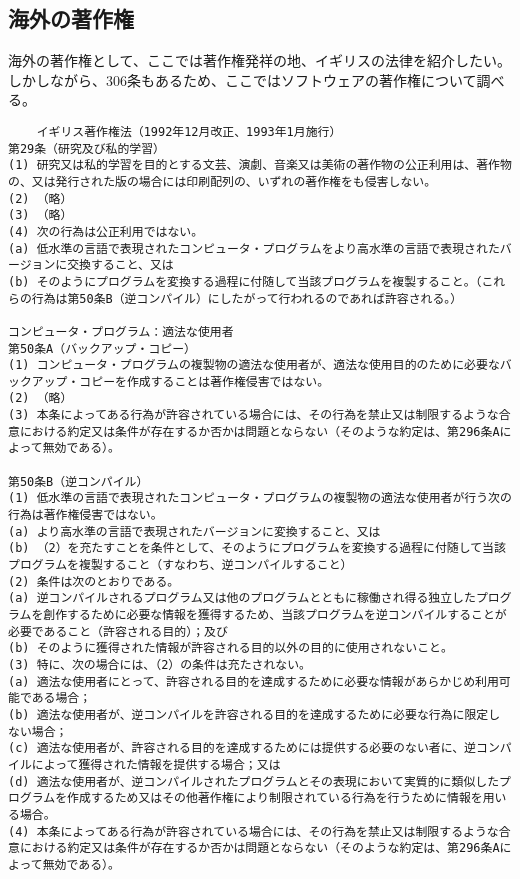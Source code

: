 \documentclass[a4j]{jsarticle}
\begin{document}
\subsection*{海外の著作権}
海外の著作権として、ここでは著作権発祥の地、イギリスの法律を紹介したい。しかしながら、306条もあるため、ここではソフトウェアの著作権について調べる。
\begin{verbatim}
    イギリス著作権法（1992年12月改正、1993年1月施行）
第29条（研究及び私的学習）
(1)	研究又は私的学習を目的とする文芸、演劇、音楽又は美術の著作物の公正利用は、著作物の、又は発行された版の場合には印刷配列の、いずれの著作権をも侵害しない。
(2)	（略）
(3)	（略）
(4)	次の行為は公正利用ではない。
(a)	低水準の言語で表現されたコンピュータ・プログラムをより高水準の言語で表現されたバージョンに交換すること、又は
(b)	そのようにプログラムを変換する過程に付随して当該プログラムを複製すること。（これらの行為は第50条B（逆コンパイル）にしたがって行われるのであれば許容される。）

コンピュータ・プログラム：適法な使用者
第50条A（バックアップ・コピー）
(1)	コンピュータ・プログラムの複製物の適法な使用者が、適法な使用目的のために必要なバックアップ・コピーを作成することは著作権侵害ではない。
(2)	（略）
(3)	本条によってある行為が許容されている場合には、その行為を禁止又は制限するような合意における約定又は条件が存在するか否かは問題とならない（そのような約定は、第296条Aによって無効である）。

第50条B（逆コンパイル）
(1)	低水準の言語で表現されたコンピュータ・プログラムの複製物の適法な使用者が行う次の行為は著作権侵害ではない。
(a)	より高水準の言語で表現されたバージョンに変換すること、又は
(b)	（2）を充たすことを条件として、そのようにプログラムを変換する過程に付随して当該プログラムを複製すること（すなわち、逆コンパイルすること）
(2)	条件は次のとおりである。
(a)	逆コンパイルされるプログラム又は他のプログラムとともに稼働され得る独立したプログラムを創作するために必要な情報を獲得するため、当該プログラムを逆コンパイルすることが必要であること（許容される目的）；及び
(b)	そのように獲得された情報が許容される目的以外の目的に使用されないこと。
(3)	特に、次の場合には、（2）の条件は充たされない。
(a)	適法な使用者にとって、許容される目的を達成するために必要な情報があらかじめ利用可能である場合；
(b)	適法な使用者が、逆コンパイルを許容される目的を達成するために必要な行為に限定しない場合；
(c)	適法な使用者が、許容される目的を達成するためには提供する必要のない者に、逆コンパイルによって獲得された情報を提供する場合；又は
(d)	適法な使用者が、逆コンパイルされたプログラムとその表現において実質的に類似したプログラムを作成するため又はその他著作権により制限されている行為を行うために情報を用いる場合。
(4)	本条によってある行為が許容されている場合には、その行為を禁止又は制限するような合意における約定又は条件が存在するか否かは問題とならない（そのような約定は、第296条Aによって無効である）。


\end{verbatim}
\end{document}
